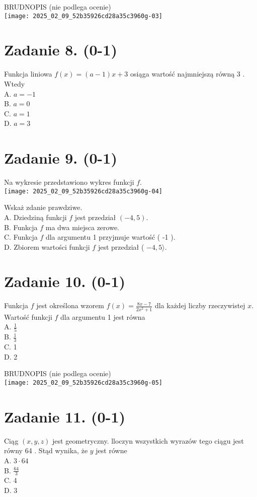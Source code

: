 \documentclass[10pt]{article}
\begin{document}
BRUDNOPIS (nie podlega ocenie)\\
\texttt{[image: 2025\_02\_09\_52b35926cd28a35c3960g-03]}

\section*{Zadanie 8. (0-1)}
Funkcja liniowa \(f(x)=(a-1) x+3\) osiąga wartość najmniejszą równą 3 . Wtedy\\
A. \(a=-1\)\\
B. \(a=0\)\\
C. \(a=1\)\\
D. \(a=3\)

\section*{Zadanie 9. (0-1)}
Na wykresie przedstawiono wykres funkcji \(f\).\\
\texttt{[image: 2025\_02\_09\_52b35926cd28a35c3960g-04]}

Wskaż zdanie prawdziwe.\\
A. Dziedziną funkcji \(f\) jest przedział \((-4,5)\).\\
B. Funkcja \(f\) ma dwa miejsca zerowe.\\
C. Funkcja \(f\) dla argumentu 1 przyjmuje wartość ( -1 ).\\
D. Zbiorem wartości funkcji \(f\) jest przedział ( \(-4,5\rangle\).

\section*{Zadanie 10. (0-1)}
Funkcja \(f\) jest określona wzorem \(f(x)=\frac{8 x-7}{2 x^{2}+1}\) dla każdej liczby rzeczywistej \(x\). Wartość funkcji \(f\) dla argumentu 1 jest równa\\
A. \(\frac{1}{5}\)\\
B. \(\frac{1}{3}\)\\
C. 1\\
D. 2

BRUDNOPIS (nie podlega ocenie)\\
\texttt{[image: 2025\_02\_09\_52b35926cd28a35c3960g-05]}

\section*{Zadanie 11. (0-1)}
Ciąg \((x, y, z)\) jest geometryczny. lloczyn wszystkich wyrazów tego ciągu jest równy 64 . Stąd wynika, że \(y\) jest równe\\
A. \(3 \cdot 64\)\\
B. \(\frac{64}{3}\)\\
C. 4\\
D. 3
\end{document}
